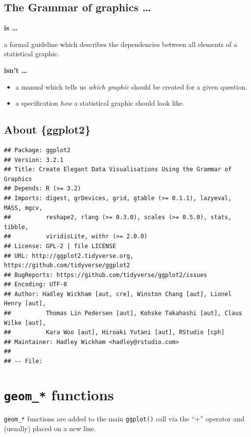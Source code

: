 \documentclass[]{book}
\providecommand{\tightlist}{%
  \setlength{\itemsep}{0pt}\setlength{\parskip}{0pt}}
\begin{document}
\hypertarget{the-grammar-of-graphics}{%
\subsection{The Grammar of graphics \ldots{}}\label{the-grammar-of-graphics}}

\textbf{is \ldots{}}

a formal guideline which describes the dependencies between all elements of a
statistical graphic.

\textbf{isn't \ldots{}}

\begin{itemize}
\tightlist
\item
  a manual which tells us \emph{which graphic} should be created for a given question.
\item
  a specification \emph{how} a statistical graphic should look like.
\end{itemize}

\hypertarget{about-ggplot2}{%
\subsection{About \{ggplot2\}}\label{about-ggplot2}}

\begin{verbatim}
## Package: ggplot2
## Version: 3.2.1
## Title: Create Elegant Data Visualisations Using the Grammar of Graphics
## Depends: R (>= 3.2)
## Imports: digest, grDevices, grid, gtable (>= 0.1.1), lazyeval, MASS, mgcv,
##          reshape2, rlang (>= 0.3.0), scales (>= 0.5.0), stats, tibble,
##          viridisLite, withr (>= 2.0.0)
## License: GPL-2 | file LICENSE
## URL: http://ggplot2.tidyverse.org, https://github.com/tidyverse/ggplot2
## BugReports: https://github.com/tidyverse/ggplot2/issues
## Encoding: UTF-8
## Author: Hadley Wickham [aut, cre], Winston Chang [aut], Lionel Henry [aut],
##          Thomas Lin Pedersen [aut], Kohske Takahashi [aut], Claus Wilke [aut],
##          Kara Woo [aut], Hiroaki Yutani [aut], RStudio [cph]
## Maintainer: Hadley Wickham <hadley@rstudio.com>
## 
## -- File:
\end{verbatim}

\hypertarget{geom_-functions}{%
\section{\texorpdfstring{\texttt{geom\_*} functions}{geom\_* functions}}\label{geom_-functions}}

\texttt{geom\_*} functions are added to the main \texttt{ggplot()} call via the ``+'' operator and
(usually) placed on a new line.
\end{document}
